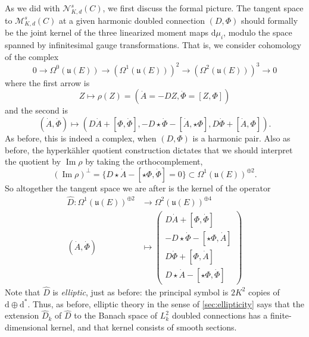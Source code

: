 \documentclass[12pt,letterpaper,reqno]{article}
\numberwithin{equation}{section}
\newcommand{\fu}{{\mathfrak u}}
\newcommand{\cM}{\ensuremath{\mathcal M}}
\newcommand{\cN}{\ensuremath{\mathcal N}}
\newcommand{\hk}{hyperk\"ahler\xspace}
\newcommand{\de}{\mathrm{d}}
\newcommand{\ti}[1]{\textit{#1}}
\DeclareMathOperator{\im}{Im}
\newcommand{\fixme}[1]{{\color{orange}{[#1]}}}
\begin{document}
As we did with $\cN^s_{K,d}(C)$, we
first discuss the formal picture. The tangent space to
$\cM_{K,d}^s(C)$ at a given harmonic doubled connection $(D,\Phi)$
should formally be the joint kernel of the
three linearized moment maps $\de \mu_i$, modulo the space spanned
by infinitesimal gauge transformations.
That is, we consider cohomology of the complex
\begin{equation}
  0 \to \Omega^0(\fu(E)) \to (\Omega^{1}(\fu(E)))^2 \to (\Omega^2(\fu(E)))^3 \to 0
\end{equation}
where the first arrow is
\begin{equation}
 Z \mapsto \rho(Z) = (\dot A = -D Z, \dot \Phi = [Z,\Phi])
\end{equation}
and the second is
\begin{equation}
(\dot A, \dot \Phi) \mapsto (D \dot{A} + [\Phi,\dot\Phi], -D \star \dot\Phi - [\dot A, \star\Phi], D \dot\Phi + [\dot A, \Phi]).
\end{equation}
As before, this is indeed a complex, when $(D,\Phi)$ is a harmonic
pair. Also as before, the \hk quotient construction dictates that
we should interpret the quotient by $\im \rho$
by taking the orthocomplement, \fixme{make this sentence clearer} 
\fixme{double-check signs and factors here!}
\begin{equation}
  (\im \rho)^\perp = \{D \star \dot{A} - [\star \Phi, \dot\Phi] = 0\} \subset \Omega^1(\fu(E))^{\oplus 2}.
\end{equation}
So altogether the tangent space we are after is the kernel of
the operator
\begin{align}
\hat{D}: \Omega^1(\fu(E))^{\oplus 2} &\to \Omega^2(\fu(E))^{\oplus 4} \\
(\dot A, \dot \Phi) &\mapsto \begin{pmatrix} D \dot{A} + [\Phi,\dot\Phi] \\ -D \star \dot\Phi - [\star \Phi, \dot A] \\ D \dot\Phi + [\Phi, \dot A] \\ D \star \dot{A} - [\star \Phi, \dot \Phi] \end{pmatrix}
\end{align}
Note that $\hat{D}$ is \ti{elliptic}, just as before:
the principal symbol is $2K^2$ copies of $\de \oplus \de^*$.
Thus, as before, elliptic theory in the sense of \autoref{sec:ellipticity}
says that the extension $\hat{D}_k$ of $\hat{D}$ 
to the Banach space of $L^2_k$
doubled connections has a finite-dimensional
kernel, and that kernel consists of smooth sections.
\end{document}
